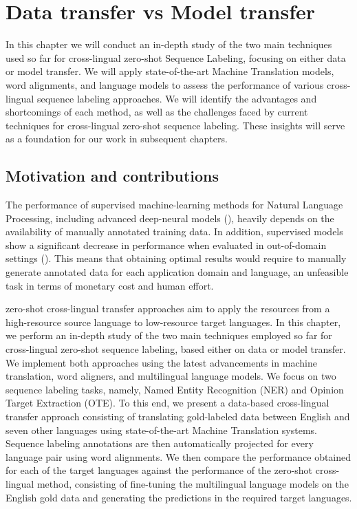 \chapter[Data transfer vs Model transfer]{Data transfer vs Model transfer}
\label{ch:model-vs-data}

In this chapter we will conduct an in-depth study of the two main techniques used so far for cross-lingual zero-shot Sequence Labeling, focusing on either data or model transfer. We will apply state-of-the-art Machine Translation models, word alignments, and language models to assess the performance of various cross-lingual sequence labeling approaches. We will identify the advantages and shortcomings of each method, as well as the challenges faced by current techniques for cross-lingual zero-shot sequence labeling. These insights will serve as a foundation for our work in subsequent chapters.

\section{Motivation and contributions}
\label{sc4:intro}


The performance of supervised machine-learning methods for Natural Language Processing, including advanced 
deep-neural models (\cite{lample-etal-2016-neural,akbik-etal-2018-contextual,devlin-etal-2019-bert,conneau-etal-2020-unsupervised}),
heavily depends on the availability of manually annotated training data. 
In addition, supervised models show a significant decrease in
performance when evaluated in out-of-domain settings
(\cite{DBLP:conf/aaai/Liu0YDJCMF21}). This means that obtaining optimal results
would require to manually generate annotated data for each application
domain and language, an unfeasible task in terms of monetary cost and human
effort. 

zero-shot cross-lingual transfer approaches aim to apply the resources from a high-resource source language to low-resource target languages. In this chapter, we perform an in-depth study of the two main techniques employed so far for cross-lingual zero-shot sequence labeling, based either on data or model transfer. We implement both approaches using the latest advancements in machine translation, word aligners, and multilingual language models. We focus on two sequence labeling tasks, namely, Named Entity Recognition (NER) and Opinion Target Extraction (OTE). To this end, we present a data-based cross-lingual transfer approach consisting of translating gold-labeled data between English and seven other languages using state-of-the-art Machine Translation systems. Sequence labeling annotations are then automatically projected for every language pair using word alignments. We then compare the performance obtained for each of the target languages against the performance of the zero-shot cross-lingual method, consisting of fine-tuning the multilingual language models on the English gold data and generating the predictions in the required target languages.

